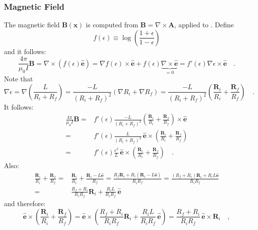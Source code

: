 \subsubsection{Magnetic Field}
The magnetic field $\mathbf{B}(\mathbf{x})$ is computed from $\mathbf{B} = \nabla \times \mathbf{A}$, applied to .
Define
\begin{equation}
 f(\epsilon) \equiv \log\left(\frac{1 + \epsilon}{1 - \epsilon} \right)
\end{equation}
and it follows:
\begin{equation}
  \frac{4 \pi}{\mu_0 I} \mathbf{B}
 = \nabla \times \left( f(\epsilon) \hat{\mathbf{e}} \right)
 = \nabla f(\epsilon) \times \hat{\mathbf{e}} + f(\epsilon) \underbrace{\nabla \times \hat{\mathbf{e}}}_{=0}
 = f'(\epsilon) \nabla \epsilon \times \hat{\mathbf{e}} \quad .
\end{equation}
Note that
\begin{equation}
   \nabla \epsilon
 = \nabla \left( \frac{L}{R_i + R_f} \right)
 = \frac{-L}{(R_i + R_f)^2}\left( \nabla R_i + \nabla R_f \right)
 = \frac{-L}{(R_i + R_f)^2}\left( \frac{\mathbf{R}_i}{R_i} + \frac{\mathbf{R}_f}{R_f} \right) \quad .
\end{equation}
It follows:
\begin{align}
   \frac{4 \pi}{\mu_0 I} \mathbf{B}
 = & f'(\epsilon) \frac{-L}{(R_i + R_f)^2} \left( \frac{\mathbf{R}_i}{R_i} + \frac{\mathbf{R}_f}{R_f} \right) \times \hat{\mathbf{e}} \\
 = & f'(\epsilon) \frac{L}{(R_i + R_f)^2} \, \hat{\mathbf{e}} \times \left( \frac{\mathbf{R}_i}{R_i} + \frac{\mathbf{R}_f}{R_f} \right) \\
 = & f'(\epsilon) \frac{\epsilon^2}{L}    \, \hat{\mathbf{e}} \times \left( \frac{\mathbf{R}_i}{R_i} + \frac{\mathbf{R}_f}{R_f} \right) \quad . \label{eqn:B_intermediate}
\end{align}
Also:
\begin{align}
   \frac{\mathbf{R}_i}{R_i} + \frac{\mathbf{R}_f}{R_f}
 = & \frac{\mathbf{R}_i}{R_i} + \frac{\mathbf{R}_i - L \hat{\mathbf{e}} }{R_f}
 =   \frac{R_f \mathbf{R}_i + R_i (\mathbf{R}_i - L \hat{\mathbf{e}}) }{R_i R_f}
 =   \frac{(R_f+R_i) \mathbf{R}_i + R_i L \hat{\mathbf{e}} }{R_i R_f} \\
 = & \frac{R_f+R_i}{R_i R_f} \mathbf{R}_i + \frac{R_i L}{R_i R_f} \, \hat{\mathbf{e}}
\end{align}
and therefore:
\begin{equation}
   \hat{\mathbf{e}} \times \left( \frac{\mathbf{R}_i}{R_i} + \frac{\mathbf{R}_f}{R_f} \right)
 = \hat{\mathbf{e}} \times \left( \frac{R_f+R_i}{R_i R_f} \mathbf{R}_i + \frac{R_i L}{R_i R_f} \, \hat{\mathbf{e}} \right)
 = \frac{R_f+R_i}{R_i R_f} \, \hat{\mathbf{e}} \times \mathbf{R}_i \quad ,
\end{equation}
